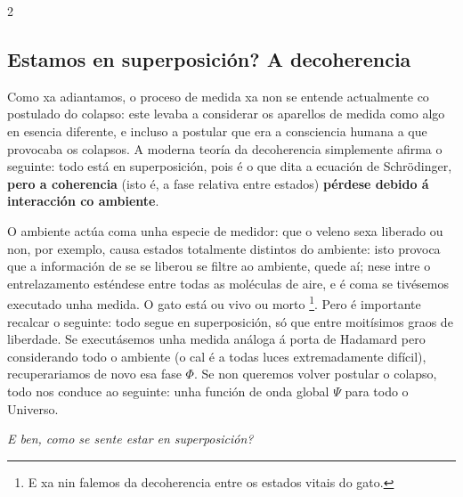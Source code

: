 \begin{multicols}{2}
\subsection*{Estamos en superposición? A decoherencia}

Como xa adiantamos, o proceso de medida xa non se entende actualmente co
postulado do colapso: este levaba a considerar os aparellos de medida como
algo en esencia diferente, e incluso a postular que era a consciencia humana a
que provocaba os colapsos. A moderna teoría da decoherencia simplemente afirma
o seguinte: todo está en superposición, pois é o que dita a ecuación de
Schrödinger, \textbf{pero a coherencia} (isto é, a fase relativa entre estados)
\textbf{pérdese debido á interacción co ambiente}.

O ambiente actúa coma unha especie de medidor: que o veleno sexa liberado ou
non, por exemplo, causa estados totalmente distintos do ambiente: isto provoca
que a información de se se liberou se filtre ao ambiente, quede aí; nese intre
o entrelazamento esténdese entre todas as moléculas de aire, e é coma se
tivésemos executado unha medida. O gato está ou vivo ou morto \footnote{E xa
nin falemos da decoherencia entre os estados vitais do gato.}. Pero é
importante recalcar o seguinte: todo segue en superposición, só que entre
moitísimos graos de liberdade. Se executásemos unha medida análoga á porta de
Hadamard pero considerando todo o ambiente (o cal é a todas luces
extremadamente difícil), recuperariamos de novo esa fase $\Phi$. Se non
queremos volver postular o colapso, todo nos conduce ao seguinte: unha función
de onda global $\Psi$ para todo o Universo.

\textit{E ben, como se sente estar en superposición?}

\printbibliography

\end{multicols}
